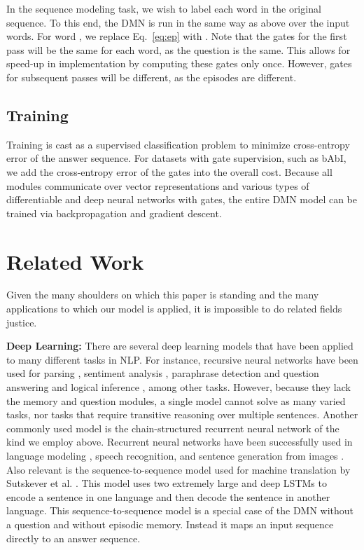 \documentclass{article}
\begin{document}
In the sequence modeling task, we wish to label each word in the original sequence. To this end, the DMN is run in the same way as above over the input words. For word , we replace Eq.~\ref{eq:ep} with . Note that the gates for the first pass will be the same for each word, as the question is the same. This allows for speed-up in implementation by computing these gates only once. However, gates for subsequent passes will be different, as the episodes are different.


\subsection{Training}
Training is cast as a supervised classification problem to minimize cross-entropy error of the answer sequence. For datasets with gate supervision, such as bAbI, we add the cross-entropy error of the gates into the overall cost.
Because all modules communicate over vector representations and various types of differentiable and deep neural networks with gates, the entire DMN model can be trained via backpropagation and gradient descent.


\section{Related Work}
Given the many shoulders on which this paper is standing and the many applications to which our model is applied, it is impossible to do related fields justice.
 
\textbf{Deep Learning:}   
There are several deep learning models that have been applied to many different tasks in NLP. For instance, recursive neural networks have been used for parsing \cite{Socher2011}, sentiment analysis \cite{Socher2013EMNLP}, paraphrase detection \cite{Socher2011} and question answering \cite{Iyyer2014} and logical inference \cite{Bowman2014}, among other tasks. However, because they lack the memory and question modules, a single model cannot solve as many varied tasks, nor tasks that require transitive reasoning over multiple sentences.
Another commonly used model is the chain-structured recurrent neural network of the kind we employ above. Recurrent neural networks have been successfully used in language modeling \cite{Mikolov2012}, speech recognition, and sentence generation from images \cite{Karpathy2015}. 
Also relevant is the sequence-to-sequence model used for machine translation by Sutskever et al. \cite{Sutskever2014}. This model uses two extremely large and deep LSTMs to encode a sentence in one language and then decode the sentence in another language. This sequence-to-sequence model is a special case of the DMN without a question and without episodic memory. Instead it maps an input sequence directly to an answer sequence.
\end{document}
